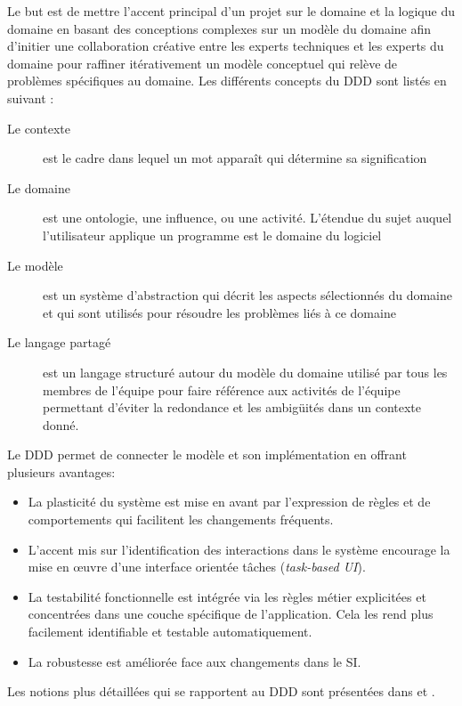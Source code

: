 	Le but est de mettre l'accent principal d'un projet sur le domaine et la logique du 
	domaine en basant des conceptions complexes sur un modèle du domaine afin 
	d'initier une collaboration créative entre les experts techniques et les experts du 
	domaine pour raffiner itérativement un modèle conceptuel qui relève de 
	problèmes 
	spécifiques au domaine.
	Les différents concepts du \gls{DDD} sont listés en suivant :
	\begin{description}
		\item[Le contexte] est le cadre dans lequel un mot apparaît qui détermine sa 
		signification
		\item[Le domaine] est une ontologie, une influence, ou une activité. 
		L'étendue du sujet auquel l'utilisateur applique un programme est le domaine 
		du logiciel 
		\item[Le modèle] est un système d'abstraction qui décrit les aspects 
		sélectionnés du domaine et qui sont utilisés pour résoudre les problèmes liés 
		à ce domaine
		\item[Le langage partagé] est un langage structuré autour du modèle du 
		domaine utilisé par tous les membres de l'équipe pour faire référence aux 
		activités de l'équipe permettant d'éviter la redondance et les ambigüités dans 
		un contexte donné.
	\end{description}
	Le \gls{DDD} permet de connecter le modèle et son implémentation en offrant 
	plusieurs avantages:
	\begin{itemize}
		\item La plasticité du système est mise en avant par l'expression de règles 
		et de comportements qui facilitent les changements fréquents.
		\item L'accent mis sur l'identification des interactions dans le système 
		encourage la mise en \oe{}uvre d'une interface orientée tâches 
		(\textit{task-based UI}).
		\item La testabilité fonctionnelle est intégrée via les règles métier explicitées 
		et concentrées dans une couche spécifique de l'application. Cela les rend 
		plus facilement identifiable et testable automatiquement.
		\item La robustesse est améliorée face aux changements dans le SI.
	\end{itemize}
	
	Les notions plus détaillées qui se rapportent au \gls{DDD} sont présentées dans 
	\cite{Evans2003} et \cite{Vernon2013}.
	
